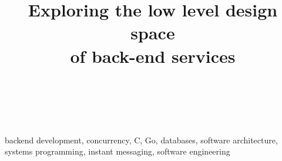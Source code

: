 \documentclass[journal]{IEEEtran}
\begin{document}
\title{Exploring the low level design space \\of back-end services}

\author{\\
\\
}

\maketitle


\begin{IEEEkeywords}
backend development, concurrency, C, Go, databases, software architecture, systems programming, instant messaging, software engineering
\end{IEEEkeywords}





%



\nocite{*}

\end{document}
